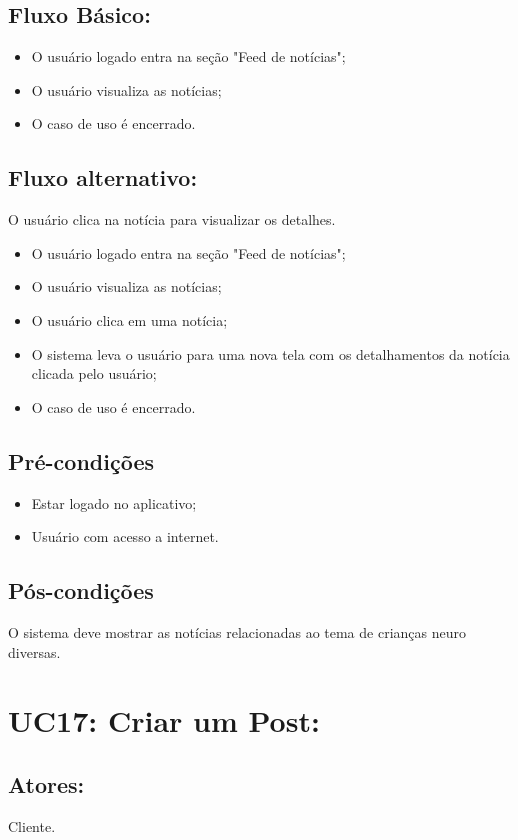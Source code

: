 \subsection{Fluxo Básico:}

\begin{itemize}
    \item O usuário logado entra na seção "Feed de notícias";
    \item O usuário visualiza as notícias;
    \item O caso de uso é encerrado. 
\end{itemize}
\subsection{Fluxo alternativo:}
O usuário clica na notícia para visualizar os detalhes. 
\begin{itemize}
    \item O usuário logado entra na seção "Feed de notícias";
    \item O usuário visualiza as notícias;
    \item O usuário clica em uma notícia;
    \item O sistema leva o usuário para uma nova tela com os detalhamentos da notícia clicada pelo usuário;
    \item O caso de uso é encerrado. 
\end{itemize}
\subsection{Pré-condições}
\begin{itemize}
    \item Estar logado no aplicativo;
    \item Usuário com acesso a internet. 
\end{itemize}

\subsection{Pós-condições}
 O sistema deve mostrar as notícias relacionadas ao tema de crianças neuro diversas. 
\section{UC17: Criar um Post: }

\subsection{Atores:}
Cliente.
